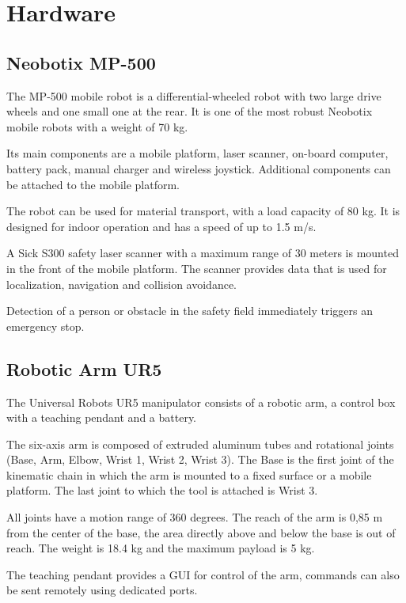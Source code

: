 \section{Hardware}

\subsection{Neobotix MP-500}
The MP-500 mobile robot is a differential-wheeled robot with two large drive wheels and one small one at the rear. It is one of the most robust Neobotix mobile robots with a weight of 70 kg.\par
Its main components are a mobile platform, laser scanner, on-board computer, battery pack, manual charger and wireless joystick. Additional components can be attached to the mobile platform.\par
The robot can be used for material transport, with a load capacity of 80 kg. It is designed for indoor operation and has a speed of up to 1.5 m/s.\par
A Sick S300 safety laser scanner with a maximum range of 30 meters is mounted in the front of the mobile platform. The scanner provides data that is used for localization, navigation and collision avoidance.\par
Detection of a person or obstacle in the safety field immediately triggers an emergency stop.\par


\subsection{Robotic Arm UR5}
The Universal Robots UR5 manipulator consists of a robotic arm, a control box with a teaching pendant and a battery.\par
The six-axis arm is composed of extruded aluminum tubes and rotational joints (Base, Arm, Elbow, Wrist 1, Wrist 2, Wrist 3). The Base is the first joint of the kinematic chain in which the arm is mounted to a fixed surface or a mobile platform. The last joint to which the tool is attached is Wrist 3.\par
All joints have a motion range of 360 degrees. The reach of the arm is 0,85 m from the center of the base, the area directly above and below the base is out of reach. The weight is 18.4 kg and the maximum payload is 5 kg.\par
The teaching pendant provides a GUI for control of the arm, commands can also be sent remotely using dedicated ports.\par

